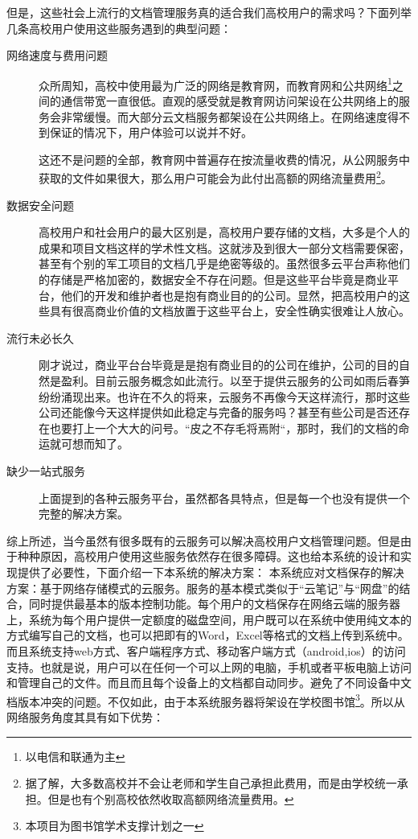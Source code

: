 但是，这些社会上流行的文档管理服务真的适合我们高校用户的需求吗？下面列举几条高校用户使用这些服务遇到的典型问题：
\begin{description}
\item[网络速度与费用问题] 众所周知，高校中使用最为广泛的网络是教育网，而教育网和公共网络\footnote{以电信和联通为主}之间的通信带宽一直很低。直观的感受就是教育网访问架设在公共网络上的服务会非常缓慢。而大部分云文档服务都架设在公共网络上。在网络速度得不到保证的情况下，用户体验可以说并不好。

  这还不是问题的全部，教育网中普遍存在按流量收费的情况，从公网服务中获取的文件如果很大，那么用户可能会为此付出高额的网络流量费用\footnote{据了解，大多数高校并不会让老师和学生自己承担此费用，而是由学校统一承担。但是也有个别高校依然收取高额网络流量费用。}。
\item[数据安全问题] 高校用户和社会用户的最大区别是，高校用户要存储的文档，大多是个人的成果和项目文档这样的学术性文档。这就涉及到很大一部分文档需要保密，甚至有个别的军工项目的文档几乎是绝密等级的。虽然很多云平台声称他们的存储是严格加密的，数据安全不存在问题。但是这些平台毕竟是商业平台，他们的开发和维护者也是抱有商业目的的公司。显然，把高校用户的这些具有很高商业价值的文档放置于这些平台上，安全性确实很难让人放心。
\item[流行未必长久] 刚才说过，商业平台台毕竟是是抱有商业目的的公司在维护，公司的目的自然是盈利。目前云服务概念如此流行。以至于提供云服务的公司如雨后春笋纷纷涌现出来。也许在不久的将来，云服务不再像今天这样流行，那时这些公司还能像今天这样提供如此稳定与完备的服务吗？甚至有些公司是否还存在也要打上一个大大的问号。“皮之不存毛将焉附“，那时，我们的文档的命运就可想而知了。
\item[缺少一站式服务] 上面提到的各种云服务平台，虽然都各具特点，但是每一个也没有提供一个完整的解决方案。
\end{description}
综上所述，当今虽然有很多既有的云服务可以解决高校用户文档管理问题。但是由于种种原因，高校用户使用这些服务依然存在很多障碍。这也给本系统的设计和实现提供了必要性，下面介绍一下本系统的解决方案：
本系统应对文档保存的解决方案：基于网络存储模式的云服务。服务的基本模式类似于“云笔记”与“网盘”的结合，同时提供最基本的版本控制功能。每个用户的文档保存在网络云端的服务器上，系统为每个用户提供一定额度的磁盘空间，用户既可以在系统中使用纯文本的方式编写自己的文档，也可以把即有的Word，Excel等格式的文档上传到系统中。而且系统支持web方式、客户端程序方式、移动客户端方式（android,ios）的访问支持。也就是说，用户可以在任何一个可以上网的电脑，手机或者平板电脑上访问和管理自己的文件。而且而且每个设备上的文档都自动同步。避免了不同设备中文档版本冲突的问题。不仅如此，由于本系统服务器将架设在学校图书馆\footnote{本项目为图书馆学术支撑计划之一}。所以从网络服务角度其具有如下优势：
